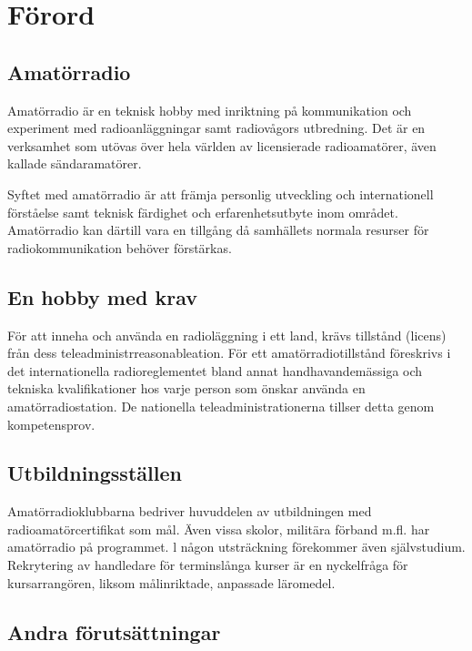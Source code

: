 \onecolumn


\chapter*{Förord}

\begin{rev-ogranskat}

\section*{Amatörradio}

Amatörradio är en teknisk hobby med inriktning på kommunikation och experiment
med radioanläggningar samt radiovågors utbredning. Det är en verksamhet som
utövas över hela världen av licensierade radioamatörer, även kallade
sändaramatörer.

Syftet med amatörradio är att främja personlig utveckling och internationell
förståelse samt teknisk färdighet och erfarenhetsutbyte inom området.
Amatörradio kan därtill vara en tillgång då samhällets normala resurser för
radiokommunikation behöver förstärkas.

\section*{En hobby med krav}

För att inneha och använda en radioläggning i ett land, krävs tillstånd (licens)
från dess teleadministrreasonableation. För ett amatörradiotillstånd föreskrivs 
i det
internationella radioreglementet bland annat handhavandemässiga och tekniska
kvalifikationer hos varje person som önskar använda en amatörradiostation. De
nationella teleadministrationerna tillser detta genom kompetensprov.

\section*{Utbildningsställen}

Amatörradioklubbarna bedriver huvuddelen av utbildningen med
radioamatörcertifikat som mål. Även vissa skolor, militära förband m.fl. har
amatörradio på programmet. l någon utsträckning förekommer även självstudium.
Rekrytering av handledare för terminslånga kurser är en nyckelfråga för
kursarrangören, liksom målinriktade, anpassade läromedel.

\section*{Andra förutsättningar}


\end{rev-ogranskat}
